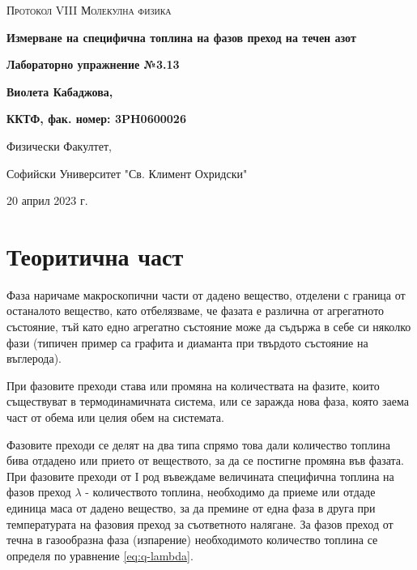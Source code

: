 \documentclass[12pt]{article}
\begin{document}
\begin{titlepage}
	\flushleft
	{\scshape\Large Протокол VIII \hspace{2cm} Молекулна физика\par}
	\vspace{4cm}
	{\huge\bfseries Измерване на специфична топлина на фазов преход на течен азот\par}
	\vspace{1cm}
	{\LARGE\bfseries Лабораторно упражнение №3.13\par}
	\vspace{5cm}
    {\LARGE\bfseries Виолета Кабаджова, \par}
    {\large\bfseries ККТФ, фак. номер: 3PH0600026\par}
	\vspace{1cm}
	
	{\large Физически Факултет, 
	
	Софийски Университет "Св. Климент Охридски"
	
	20 април 2023 г.\par}
	
\end{titlepage}

\section{Теоритична част}\label{sec:theoretical-part}
Фаза наричаме макроскопични части от дадено вещество, отделени с граница от останалото вещество, като отбелязваме, че фазата е различна от агрегатното състояние, тъй като едно агрегатно състояние може да съдържа в себе си няколко фази (типичен пример са графита и диаманта при твърдото състояние на въглерода). 

При фазовите преходи става или промяна на количествата на фазите, които съществуват в термодинамичната система, или се заражда нова фаза, която заема част от обема или целия обем на системата.

Фазовите преходи се делят на два типа спрямо това дали количество топлина бива отдадено или прието от веществото, за да се постигне промяна във фазата. При фазовите преходи от I род въвеждаме величината специфична топлина на фазов преход $\lambda$ - количеството топлина, необходимо да приеме или отдаде единица маса от дадено вещество, за да премине от една фаза в друга при температурата на фазовия преход за съответното налягане. За фазов преход от течна в газообразна фаза (изпарение) необходимото количество топлина се определя по уравнение \ref{eq:q-lambda}. 
\end{document}

